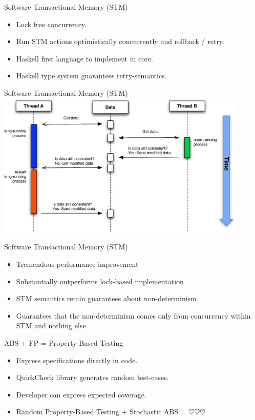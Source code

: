 \documentclass{beamer}
\begin{document}
\begin{frame}{Software Transactional Memory (STM)}
  \begin{itemize}   	
  	\item Lock free concurrency.
  	\item Run STM actions optimistically concurrently and rollback / retry.
  	\item Haskell first language to implement in core.    
    \item Haskell type system guarantees retry-semantics.
  \end{itemize}
\end{frame}

\begin{frame}{Software Transactional Memory (STM)}
  \includegraphics[width=0.9\textwidth]{./fig/stm.png}
\end{frame}

\begin{frame}{Software Transactional Memory (STM)}
  \begin{itemize}
  	\item Tremendous performance improvement
    \item Substantially outperforms lock-based implementation 
    \item STM semantics retain guarantees about non-determinism
    \item Guarantees that the non-determinism comes only from concurrency within STM and nothing else
  \end{itemize}
\end{frame}

\begin{frame}{ABS + FP = Property-Based Testing}
  \begin{itemize}
    \item Express specifications directly in code.
    \item QuickCheck library generates random test-cases.
    \item Developer can express expected coverage.
    \item Random Property-Based Testing + Stochastic ABS = $\heartsuit \heartsuit \heartsuit$
  \end{itemize}
\end{frame}
\end{document}
